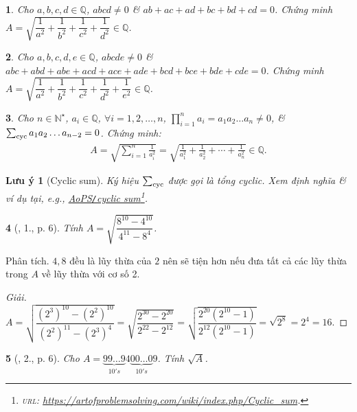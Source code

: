 \documentclass{article}
\newtheorem{baitoan}{}
\newtheorem{luuy}{Lưu ý}
\begin{document}
\begin{baitoan}
	Cho $a,b,c,d\in\mathbb{Q}$, $abcd\ne0$ \& $ab + ac + ad + bc + bd + cd = 0$. Chứng minh $A = \sqrt{\dfrac{1}{a^2} + \dfrac{1}{b^2} + \dfrac{1}{c^2} + \dfrac{1}{d^2}}\in\mathbb{Q}$.
\end{baitoan}

\begin{baitoan}
	Cho $a,b,c,d,e\in\mathbb{Q}$, $abcde\ne0$ \& $abc + abd + abe + acd + ace + ade + bcd + bce + bde + cde = 0$. Chứng minh $A = \sqrt{\dfrac{1}{a^2} + \dfrac{1}{b^2} + \dfrac{1}{c^2} + \dfrac{1}{d^2} + \dfrac{1}{e^2}}\in\mathbb{Q}$.
\end{baitoan}

\begin{baitoan}
	Cho $n\in\mathbb{N}^\star$, $a_i\in\mathbb{Q}$, $\forall i = 1,2,\ldots,n$, $\prod_{i=1}^n a_i = a_1a_2\ldots a_n\ne0$, \& $\sum_{\rm cyc} a_1a_2\ldots a_{n-2} = 0$. Chứng minh:
	\begin{align*}
		A = \sqrt{\sum_{i=1}^n \frac{1}{a_i^2}} = \sqrt{\frac{1}{a_1^2} + \frac{1}{a_2^2} + \cdots + \frac{1}{a_n^2}}\in\mathbb{Q}.
	\end{align*}
\end{baitoan}

\begin{luuy}[Cyclic sum]
	Ký hiệu $\sum_{\rm cyc}$ được gọi là tổng cyclic. Xem định nghĩa \& ví dụ tại, e.g., \href{https://artofproblemsolving.com/wiki/index.php/Cyclic_sum}{AoPS\emph{\texttt{/}}cyclic sum}\footnote{\textsc{url}: \url{https://artofproblemsolving.com/wiki/index.php/Cyclic_sum}.}.
\end{luuy}

\begin{baitoan}[\cite{Tuyen_Toan_9_old}, 1., p. 6]
	Tính $A = \sqrt{\dfrac{8^{10} - 4^{10}}{4^{11} - 8^4}}$.
\end{baitoan}
\noindent\textsf{Phân tích.} $4,8$ đều là lũy thừa của $2$ nên sẽ tiện hơn nếu đưa tất cả các lũy thừa trong $A$ về lũy thừa với cơ số 2.

\begin{proof}[Giải]
	$A = \sqrt{\dfrac{(2^3)^{10} - (2^2)^{10}}{(2^2)^{11} - (2^3)^4}} = \sqrt{\dfrac{2^{30} - 2^{20}}{2^{22} - 2^{12}}} = \sqrt{\dfrac{2^{20}(2^{10} - 1)}{2^{12}(2^{10} - 1)}} = \sqrt{2^8} = 2^4 = 16$.
\end{proof}

\begin{baitoan}[\cite{Tuyen_Toan_9_old}, 2., p. 6]
	Cho $A = \underbrace{99\ldots9}_{10's}4\underbrace{00\ldots0}_{10's}9$. Tính $\sqrt{A}$.
\end{baitoan}
\end{document}
